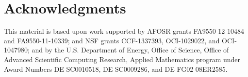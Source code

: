\documentclass[3p,times,procedia]{elsarticle}
\begin{document}
\section*{Acknowledgments}
This material is based upon work supported by AFOSR
grants FA9550-12-10484 and FA9550-11-10339; and NSF grants
CCF-1337393, OCI-1029022, and OCI-1047980; and by the U.S. Department
of Energy, Office of Science, Office of Advanced Scientific Computing
Research, Applied Mathematics program under Award Numbers
DE-SC0010518, DE-SC0009286, and DE-FG02-08ER2585. 

% 


%
\end{document}
